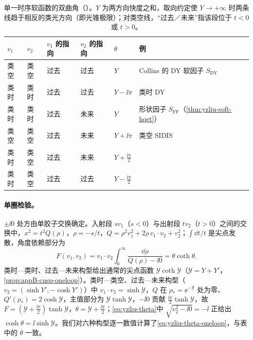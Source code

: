 \begin{table}[htbp]
\centering
\small
\renewcommand{\arraystretch}{1.1}
\begin{tabular}{@{}llllll@{}}
\toprule
$v_1$ & $v_2$ & $v_1$ 的指向 & $v_2$ 的指向 & $\theta$ & 例 \\
\midrule
类空 & 类空 & 过去 & 过去 & $Y$ & Collins 的 DY 软因子 $S_{\mathrm{DY}}$ \\
类时 & 类时 & 过去 & 过去 & $Y-\ii\pi$ & 类时 DY \\
类时 & 类时 & 过去 & 未来 & $Y$ & 形状因子 $S_{\mathrm{FF}}$（\cref{thm:yzliu-soft-hqet}） \\
类空 & 类空 & 过去 & 未来 & $Y+\ii\pi$ & 类空 SIDIS \\
类时 & 类空 & 过去 & 未来 & $Y+\frac{\ii\pi}{2}$ & \\
类时 & 类空 & 过去 & 过去 & $Y-\frac{\ii\pi}{2}$ & \\
\bottomrule
\end{tabular}
\caption{单一时序软函数的双曲角（\cite[表~1]{Liu:2022nnk}）。$Y$ 为两方向快度之和，取向约定使 $Y\to+\infty$ 时两条线趋于相反的类光方向（即光锥极限）；对类空线，“过去／未来”指该段位于 $t<0$ 或 $t>0$。}
\label{tab:yzliu-theta}
\end{table}

\paragraph{单圈检验。}$\pm\ii0$ 处方由单胶子交换确定。入射段 $sv_1$（$s<0$）与出射段 $tv_2$（$t>0$）之间的交换中，$x^2=t^2Q(\rho)$，$\rho=-s/t$，$Q=\rho^2v_1^2+2\rho\,v_1\cdot v_2+v_2^2$；$\int\dd t/t$ 是尖点发散，角度依赖部分为
\begin{equation}\label{eq:yzliu-theta-oneloop}
F(v_1,v_2)=v_1\cdot v_2\int_0^\infty\frac{\dd\rho}{Q(\rho)-\ii0}=\theta\coth\theta .
\end{equation}
类时—类时、过去—未来构型给出通常的尖点函数 $\mathcal Y\coth\mathcal Y$（$\mathcal Y=Y+Y'$，\cref{prop:appB-cusp-oneloop}）。类时—类空、过去—未来构型（$v_2=(\sinh Y',-\cosh Y')$）中 $v_1\cdot v_2=\sinh\mathcal Y$，$Q$ 在 $\rho_*=\ee^{-\mathcal Y}$ 处为零、$Q'(\rho_*)=2\cosh\mathcal Y$，主值部分为 $\mathcal Y\tanh\mathcal Y$，$-\ii0$ 贡献 $\frac{\ii\pi}{2}\tanh\mathcal Y$，故 $F=(\mathcal Y+\frac{\ii\pi}{2})\tanh\mathcal Y$，$\theta=\mathcal Y+\frac{\ii\pi}2$；\cref{eq:yzliu-theta}中 $\sqrt{v_2^2-\ii0}=-\ii$ 正给出 $\cosh\theta=\ii\sinh\mathcal Y$。我们对六种构型逐一数值计算了\cref{eq:yzliu-theta-oneloop}，与表中的 $\theta$ 一致。

